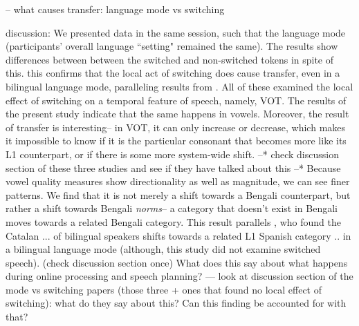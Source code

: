 \documentclass[12 pt]{article}
\begin{document}
-- what causes transfer: language mode vs switching

\alert{discussion: We presented data in the same session, such that the language mode (participants' overall language ``setting" remained the same). The results show differences between between the switched and non-switched tokens in spite of this. this confirms that the local act of switching does cause transfer, even in a bilingual language mode, paralleling results from \cite{olson2016role, tsui2019impact, piccinini2015voice}. All of these examined the local effect of switching on a temporal feature of speech, namely, VOT. The results of the present study indicate that the same happens in vowels. Moreover, the result of transfer is interesting-- in VOT, it can only increase or decrease, which makes it impossible to know if it is the particular consonant that becomes more like its L1 counterpart, or if there is some more system-wide shift. --* check discussion section of these three studies and see if they have talked about this --* Because vowel quality measures show directionality as well as magnitude, we can see finer patterns. We find that it is not merely a shift towards a Bengali counterpart, but rather a shift towards Bengali \textit{norms}-- a category that doesn't exist in Bengali moves towards a related Bengali category. This result parallels \cite{simonet2014phonetic}, who found the Catalan ... of bilingual speakers shifts towards a related L1 Spanish category .. in a bilingual language mode (although, this study did not examine switched speech). (check discussion section once) What does this say about what happens during online processing and speech planning? --- look at discussion section of the mode vs switching papers (those three + ones that found no local effect of switching): what do they say about this? Can this finding be accounted for with that?}
\end{document}
